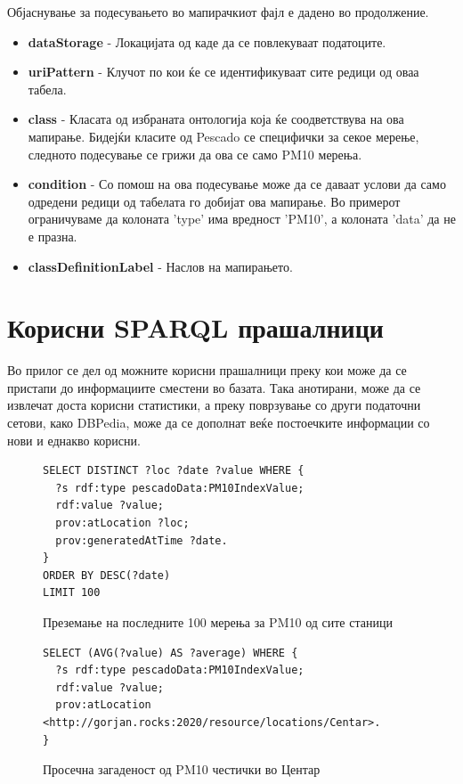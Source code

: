 \documentclass{uvamscse}
\begin{document}
Објаснување за подесувањето во мапирачкиот фајл е дадено во продолжение.

\begin{itemize}
\item \textbf{dataStorage} - Локацијата од каде да се повлекуваат податоците.
\item \textbf{uriPattern} - Клучот по кои ќе се идентификуваат сите редици од оваа табела.
\item \textbf{class} - Класата од избраната онтологија која ќе соодветствува на ова мапирање. Бидејќи класите од Pescado се специфички за секое мерење, следното подесување се грижи да ова се само PM10 мерења.
\item \textbf{condition} - Со помош на ова подесување може да се даваат услови да само одредени редици од табелата го добијат ова мапирање. Во примерот ограничуваме да колоната 'type' има вредност 'PM10', а колоната 'data' да не е празна.
\item \textbf{classDefinitionLabel} - Наслов на мапирањето.

\end{itemize}

\chapter{Корисни SPARQL прашалници}

Во прилог се дел од можните корисни прашалници преку кои може да се пристапи до информациите сместени во базата. Така анотирани, може да се извлечат доста корисни статистики, а преку поврзување со други податочни сетови, како DBPedia, може да се дополнат веќе постоечките информации со нови и еднакво корисни.

\begin{figure}[H]
\centering
\begin{snippet}
\begin{verbatim}
SELECT DISTINCT ?loc ?date ?value WHERE {
  ?s rdf:type pescadoData:PM10IndexValue;
  rdf:value ?value;
  prov:atLocation ?loc;
  prov:generatedAtTime ?date.
}
ORDER BY DESC(?date)
LIMIT 100
\end{verbatim}
\end{snippet}
\caption{Преземање на последните 100 мерења за PM10 од сите станици}
\end{figure}

\begin{figure}[H]
\centering
\begin{snippet}
\begin{verbatim}
SELECT (AVG(?value) AS ?average) WHERE {
  ?s rdf:type pescadoData:PM10IndexValue;
  rdf:value ?value;
  prov:atLocation <http://gorjan.rocks:2020/resource/locations/Centar>.
}
\end{verbatim}
\end{snippet}
\caption{Просечна загаденост од PM10 честички во Центар}
\end{figure}
\end{document}
